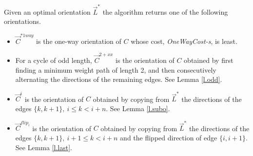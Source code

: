 \begin{definition} Given an optimal orientation $\vec{L}^*$  the algorithm returns one of the 
	following orientations.
	\begin{itemize}
		\item $\vec{C}^{*1way}$ is the one-way orientation of $C$
		whose cost, \emph{OneWayCost-s}, is least.
		\item For a cycle of odd length, $\vec{C}^{2+xx}$ is the orientation of $C$ 
		obtained 
		by first finding a minimum weight path of length 2, and then consecutively alternating the directions of the remaining edges. 
		See Lemma \ref{l.odd}.
		\item $\vec{C}^{i}$ is the orientation of $C$ obtained by copying 
		from $\vec{L}^*$ the directions
		of the edges $\{k,k+1\},\ i\leq k <i+n$. See Lemma \ref{l.subo}.
		\item 	$\vec{C}^{flip_i}$ is the orientation of $C$ obtained by copying 
		from $\vec{L}^*$ the directions
		of the edges $\{k,k+1\},\ i+1\leq k <i+n$ and the flipped  
		direction of edge $\{i, i+1\}$.
		See Lemma \ref{l.last}.
	\end{itemize}
\end{definition}

